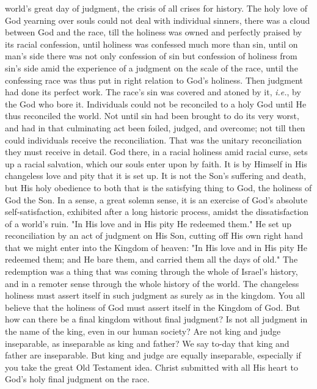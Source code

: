 \documentclass[12pt,letterpaper,oneside]{book}
\begin{document}
world's great day of judgment, the crisis of all 
crises for history. The holy love of God yearning 
over souls could not deal with individual 
sinners, there was a cloud between God and the 
race, till the holiness was owned and perfectly 
praised by its racial confession, until holiness 
was confessed much more than sin, until on 
man's side there was not only confession of 
sin but confession of holiness from sin's side 
amid the experience of a judgment on the 
scale of the race, until the confessing race 
was thus put in right relation to God's holiness. 
Then judgment had done its perfect 
work. The race's sin was covered and atoned 
by it, \textit{i.e.}, by the God who bore it. Individuals 
could not be reconciled to a holy God until 
He thus reconciled the world. Not until sin had 
been brought to do its very worst, and had in 
that culminating act been foiled, judged, and 
overcome; not till then could individuals receive 
the reconciliation. That was the unitary reconciliation 
they must receive in detail. God there, 
in a racial holiness amid racial curse, sets 
up a racial salvation, which our souls enter 
upon by faith. It is by Himself in His changeless 
love and pity that it is set up. It is not the 
Son's suffering and death, but His holy obedience 
to both that is the satisfying thing to God, the 
holiness of God the Son. In a sense, a great 
solemn sense, it is an exercise of God's absolute 
self-satisfaction, exhibited after a long historic 
process, amidst the dissatisfaction of a world's 
ruin. "In His love and in His pity He redeemed 
them." He set up reconciliation by an act of 
judgment on His Son, cutting off His own right 
hand that we might enter into the Kingdom 
of heaven: "In His love and in His pity He 
redeemed them; and He bare them, and carried 
them all the days of old." The redemption was 
a thing that was coming through the whole of 
Israel's history, and in a remoter sense through 
the whole history of the world. The changeless 
holiness must assert itself in such judgment as 
surely as in the kingdom. You all believe that 
the holiness of God must assert itself in the 
Kingdom of God. But how can there be a final 
kingdom without final judgment? Is not all 
judgment in the name of the king, even in our 
human society? Are not king and judge inseparable, 
as inseparable as king and father? 
We say to-day that king and father are inseparable. 
But king and judge are equally 
inseparable, especially if you take the great Old 
Testament idea. Christ submitted with all His 
heart to God's holy final judgment on the race. 
\end{document}
